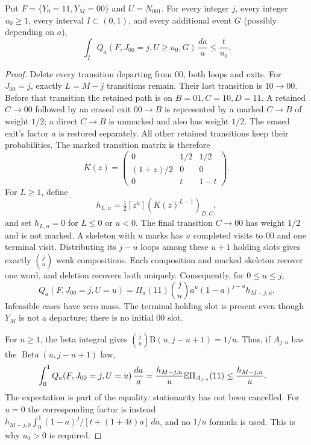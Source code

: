 \begin{lemma}
\label{lem:mixture}
Put $F=\{Y_0=11,Y_M=00\}$ and $U=N_{001}$. For every integer $j$,
every integer $u_0\ge1$, every interval $I\subset(0,1)$, and every
additional event $G$ (possibly depending on $a$),
\[
 \int_I Q_a(F,J_{00}=j,U\ge u_0,G)\,\frac{da}{a}
 \le \frac{t}{u_0}.
\]
\end{lemma}
\begin{proof}
Delete every transition departing from $00$, both loops and exits.
For $J_{00}=j$, exactly $L=M-j$ transitions remain. Their last transition
is $10\to00$. Before that transition the retained path is on
$B=01,C=10,D=11$. A retained $C\to00$ followed by an erased exit
$00\to B$ is represented by a marked $C\to B$ of weight $1/2$;
a direct $C\to B$ is unmarked and also has weight $1/2$. The erased
exit's factor $a$ is restored separately. All other retained transitions
keep their probabilities. The marked transition matrix is therefore
\[
 K(z)=\begin{pmatrix}
 0&1/2&1/2\\ (1+z)/2&0&0\\ 0&t&1-t
 \end{pmatrix}.
\]
For $L\ge1$, define
\[
 h_{L,u}=\tfrac12[z^u](K(z)^{L-1})_{D,C},
\]
and set $h_{L,u}=0$ for $L\le0$ or $u<0$. The final transition
$C\to00$ has weight $1/2$ and is not marked. A skeleton with $u$ marks
has $u$ completed visits to $00$ and one terminal visit. Distributing
its $j-u$ loops among these $u+1$ holding slots gives exactly
$\binom ju$ weak compositions. Each composition and marked skeleton
recover one word, and deletion recovers both uniquely. Consequently,
for $0\le u\le j$,
\begin{equation}
 Q_a(F,J_{00}=j,U=u)
 =\Pi_a(11)\binom ju a^u(1-a)^{j-u}h_{M-j,u}.
 \label{eq:marked-word-identity}
\end{equation}
Infeasible cases have zero mass. The terminal holding slot is present
even though $Y_M$ is not a departure; there is no initial $00$ slot.

For $u\ge1$, the beta integral gives
$\binom ju\mathrm B(u,j-u+1)=1/u$. Thus, if
$A_{j,u}$ has the $\operatorname{Beta}(u,j-u+1)$ law,
\begin{align}
 \int_0^1 Q_a(F,J_{00}=j,U=u)\,\frac{da}{a}
 &=\frac{h_{M-j,u}}{u}\mathbb E\Pi_{A_{j,u}}(11)
 \le\frac{h_{M-j,u}}{u}. \label{eq:stationary-beta-factor}
\end{align}
The expectation is part of the equality: stationarity has not been
cancelled. For $u=0$ the corresponding factor is instead
$h_{M-j,0}\int_0^1(1-a)^j/[t+(1+4t)a]\,da$, and no $1/u$ formula
is used. This is why $u_0>0$ is required.


\end{proof}
